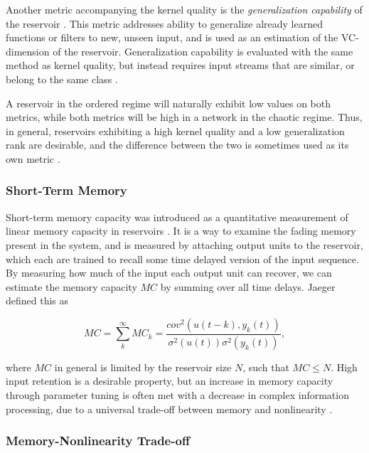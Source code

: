 Another metric accompanying the kernel quality is the \textit{generalization
capability} of the reservoir \cite{legenstein_edge_2007}. This metric addresses
ability to generalize already learned functions or filters to new, unseen input,
and is used as an estimation of the VC-dimension of the
reservoir. Generalization capability is evaluated with the same method as kernel
quality, but instead requires input streams that are similar, or belong to the
same class \cite{busing_connectivity_2010}.

A reservoir in the ordered regime will naturally exhibit low values on both
metrics, while both metrics will be high in a network in the chaotic
regime. Thus, in general, reservoirs exhibiting a high kernel quality and a low
generalization rank are desirable, and the difference between the two is
sometimes used as its own metric \cite{busing_connectivity_2010}.

\subsubsection{Short-Term Memory}

Short-term memory capacity was introduced as a quantitative measurement of
linear memory capacity in reservoirs \cite{jaeger_short_2002}. It is a way to
examine the fading memory present in the system, and is measured by attaching
output units to the reservoir, which each are trained to recall some time
delayed version of the input sequence. By measuring how much of the input each
output unit can recover, we can estimate the memory capacity $MC$ by summing
over all time delays. Jaeger defined this as

\begin{equation}
  MC =
  \sum_{k}^{\infty}MC_{k} =
  \frac
  {cov^2(u(t-k), y_k(t))}
  {\sigma^{2}(u(t))\sigma^{2}(y_{k}(t))}
  ,
  \label{stm-eq}
\end{equation}

where $MC$ in general is limited by the reservoir size $N$, such that $MC \leq
N$. High input retention is a desirable property, but an increase in memory
capacity through parameter tuning is often met with a decrease in complex
information processing, due to a universal trade-off between memory and
nonlinearity \cite{dambre_information_2012}.


\subsubsection{Memory-Nonlinearity Trade-off}

